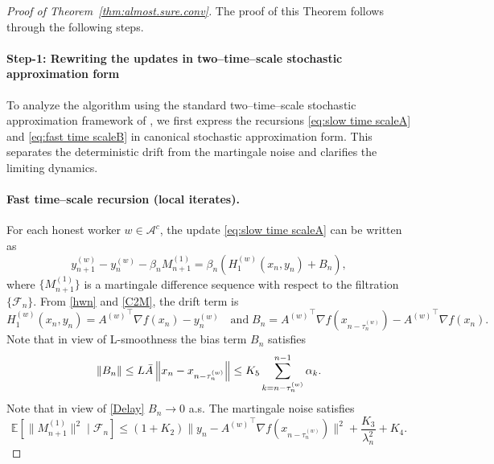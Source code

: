\documentclass{article}
\newcommand{\norm}[1]{\left\lVert #1 \right\rVert}
\begin{document}
\begin{proof}[Proof of Theorem~\ref{thm:almost.sure.conv}] The proof of this Theorem follows through the following steps.

\paragraph{Step-1: Rewriting the updates in two--time--scale stochastic approximation form}

To analyze the algorithm using the standard two--time--scale stochastic approximation framework of \cite{yaji2020stochastic}, we first express the recursions \eqref{eq:slow time scaleA} and \eqref{eq:fast time scaleB} in canonical stochastic approximation form. This separates the deterministic drift from the martingale noise and clarifies the limiting dynamics.

\paragraph{Fast time--scale recursion (local iterates).}
For each honest worker \(w\in\mathcal A^c\), the update \eqref{eq:slow time scaleA} can be written as
\begin{equation}
y_{n+1}^{(w)} - y_n^{(w)} - \beta_n M_{n+1}^{(1)}
= \beta_n ( H_1^{(w)}(x_n,y_n) + B_n),
\label{eq:sa_fast_form}
\end{equation}
where \(\{M_{n+1}^{(1)}\}\) is a martingale difference sequence with respect to the filtration \(\{\mathcal F_n\}\).
From \eqref{hwn} and \eqref{C2M}, the drift term is
\begin{equation}
H_1^{(w)}(x_n,y_n)
= {A^{(w)}}^\top \nabla f(x_n) - y_n^{(w)} \quad \text{and} \;  B_n =   {A^{(w)}}^\top \nabla f(x_{n- \tau_n^{(w)}}) - {A^{(w)}}^\top \nabla f(x_n) .
\label{eq:H1_def}
\end{equation}
Note that in view of L-smoothness the bias term $B_n$ satisfies
\begin{equation*}
    \begin{split}
        \norm{B_n} \leq L \Bar{A} \norm{x_n - x_{n-\tau_n^{(w)}}} \leq K_5 \sum_{k=n-\tau_n^{(w)}}^{n-1} \alpha_k. 
    \end{split}
\end{equation*}
Note that in view of \eqref{Delay} $B_n \to 0$ a.s.
The martingale noise satisfies
\begin{equation}
\mathbb{E}\!\left[\|M_{n+1}^{(1)}\|^2 \mid \mathcal F_n\right]
\le (1+K_2)\| y_n - {A^{(w)}}^\top \nabla f(x_{n- \tau_n^{(w)}})\|^2
+ \frac{K_3}{\lambda_n^2}
+ K_4 .
\label{eq:noise_fast}
\end{equation}


\end{proof}
\end{document}
